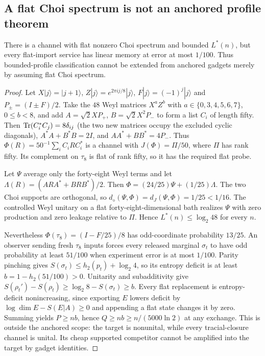 \subsection{A flat Choi spectrum is not an anchored profile theorem}
\begin{proposition}\label{prop:flat-spectrum-boundary}
There is a channel with flat nonzero Choi spectrum and bounded
$L^*(n)$, but every flat-import service has linear memory at error
at most $1/100$. Thus bounded-profile classification cannot be
extended from anchored gadgets merely by assuming flat Choi spectrum.
\end{proposition}
\begin{proof}
Let $X|j\rangle=|j+1\rangle$, $Z|j\rangle=e^{2\pi ij/8}|j\rangle$,
$F|j\rangle=(-1)^j|j\rangle$ and $P_\pm=(I\pm F)/2$.
Take the $48$ Weyl matrices $X^aZ^b$ with
$a\in\{0,3,4,5,6,7\}$, $0\leq b<8$, and add
$A=\sqrt2XP_+$, $B=\sqrt2X^2P_-$ to form a list $C_i$ of length fifty.
Then $\operatorname{Tr}(C_i^*C_j)=8\delta_{ij}$ (the two new matrices occupy the
excluded cyclic diagonals), $A^*A+B^*B=2I$, and
$AA^*+BB^*=4P_-$. Thus
$\Phi(R)=50^{-1}\sum_iC_iRC_i^*$ is a channel with
$J(\Phi)=\Pi/50$, where $\Pi$ has rank fifty. Its complement on
$\tau_8$ is flat of rank fifty, so it has the required flat probe.

Let $\Psi$ average only the forty-eight Weyl terms and let
$\Lambda(R)=(ARA^*+BRB^*)/2$. Then
$\Phi=(24/25)\Psi+(1/25)\Lambda$. The two Choi supports are
orthogonal, so $d_\diamond(\Psi,\Phi)=d_J(\Psi,\Phi)=1/25<1/16$.
The controlled Weyl unitary on a flat forty-eight-dimensional bath
realizes $\Psi$ with zero production and zero leakage relative to $\Pi$.
Hence $L^*(n)\leq\log_2 48$ for every $n$.

Nevertheless $\Phi(\tau_8)=(I-F/25)/8$ has odd-coordinate probability
$13/25$. An observer sending fresh $\tau_8$ inputs forces every
released marginal $\sigma_t$ to have odd probability at least $51/100$
when experiment error is at most $1/100$. Parity pinching gives
$S(\sigma_t)\leq h_2(p_t)+\log_2 4$, so its entropy deficit is
at least $b=1-h_2(51/100)>0$. Unitarity and subadditivity give
$S(\rho_t')-S(\rho_t)\geq\log_2 8-S(\sigma_t)\geq b$.
Every flat replacement is entropy-deficit nonincreasing, since
exporting $E$ lowers deficit by $\log\dim E-S(E|A)\geq0$ and
appending a flat state changes it by zero. Summing yields
$P\geq nb$, hence $Q\geq nb\geq n/(5000\ln2)$ at any exchange.
This is outside the anchored scope: the target is nonunital, while
every tracial-closure channel is unital. Its cheap supported competitor
cannot be amplified into the target by gadget identities.
\end{proof}

